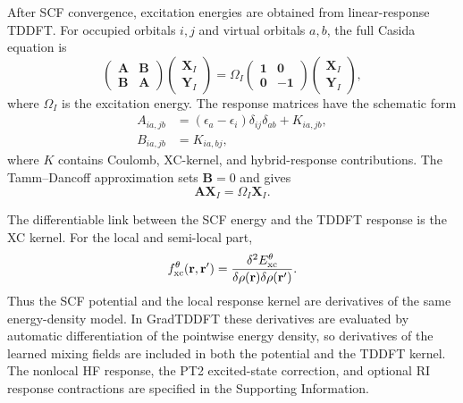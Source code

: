 After SCF convergence, excitation energies are obtained from
linear-response TDDFT. For occupied orbitals $i,j$ and virtual
orbitals $a,b$, the full Casida equation is
\begin{equation}
  \begin{pmatrix}
    \mathbf{A} & \mathbf{B} \\
    \mathbf{B} & \mathbf{A}
  \end{pmatrix}
  \begin{pmatrix}
    \mathbf{X}_I \\
    \mathbf{Y}_I
  \end{pmatrix}
  =
  \Omega_I
  \begin{pmatrix}
    \mathbf{1} & \mathbf{0} \\
    \mathbf{0} & -\mathbf{1}
  \end{pmatrix}
  \begin{pmatrix}
    \mathbf{X}_I \\
    \mathbf{Y}_I
  \end{pmatrix},
  \label{eq:casida-main}
\end{equation}
where $\Omega_I$ is the excitation energy. The response matrices have
the schematic form
\begin{equation}
  \begin{aligned}
  A_{ia,jb}
  &=
  (\epsilon_a-\epsilon_i)\delta_{ij}\delta_{ab}
  + K_{ia,jb},
  \\
  B_{ia,jb}
  &=
  K_{ia,bj},
  \end{aligned}
  \label{eq:ab-main}
\end{equation}
where $K$ contains Coulomb, XC-kernel, and hybrid-response
contributions. The Tamm--Dancoff approximation sets
$\mathbf{B}=0$ and gives
\begin{equation}
  \mathbf{A}\mathbf{X}_I=\Omega_I\mathbf{X}_I .
  \label{eq:tda-main}
\end{equation}

The differentiable link between the SCF energy and the TDDFT response
is the XC kernel. For the local and semi-local part,
\begin{equation}
  f_{\rm xc}^{\theta}(\mathbf{r},\mathbf{r}')
  =
  \frac{\delta^2 E_{\rm xc}^{\theta}}
       {\delta\rho(\mathbf{r})\delta\rho(\mathbf{r}')}.
  \label{eq:fxc-main}
\end{equation}
Thus the SCF potential and the local response kernel are derivatives
of the same energy-density model. In GradTDDFT these derivatives are
evaluated by automatic differentiation of the pointwise energy
density, so derivatives of the learned mixing fields are included in
both the potential and the TDDFT kernel. The nonlocal HF response,
the PT2 excited-state correction, and optional RI response
contractions are specified in the Supporting Information.

